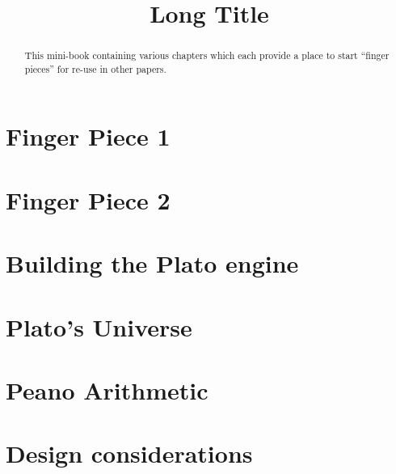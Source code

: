 \documentclass[a4paper,openany]{amsbook}
\begin{document}
\sloppy

\title[Short Title]{Long Title}

%

\begin{abstract}
This mini-book containing various chapters which each provide a place to start
``finger pieces'' for re-use in other papers.
\end{abstract} 
\maketitle 
\tableofcontents 


\chapter{Finger Piece 1}


\chapter{Finger Piece 2}


\chapter{Building the Plato engine}


\chapter{Plato's Universe}


\chapter{Peano Arithmetic}


\chapter{Design considerations}


\printbibliography
\end{document}
